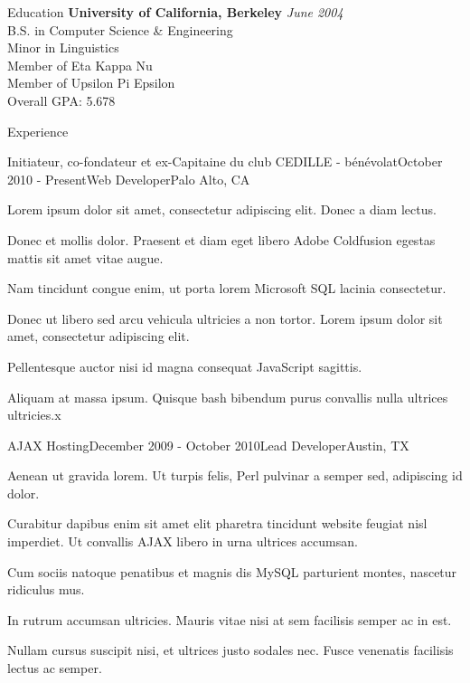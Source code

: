 \documentclass{resume}
\begin{document}
  \begin{rSection}{Education}
    {\bf University of California, Berkeley} \hfill {\em June 2004} \\ 
    { B.S. in Computer Science \& Engineering } \\
    { Minor in Linguistics } \smallskip \\
    { Member of Eta Kappa Nu } \\
    { Member of Upsilon Pi Epsilon } \\
    Overall GPA: 5.678
  \end{rSection}
   
  \begin{rSection}{Experience}
  
    \begin{rSubsection}{Initiateur, co-fondateur et ex-Capitaine du club CEDILLE - bénévolat}{October 2010 - Present}{Web Developer}{Palo Alto, CA}
    \item Lorem ipsum dolor sit amet, consectetur adipiscing elit. Donec a diam lectus.
    \item Donec et mollis dolor. Praesent et diam eget libero Adobe Coldfusion egestas mattis sit amet vitae augue.
    \item Nam tincidunt congue enim, ut porta lorem Microsoft SQL lacinia consectetur.
    \item Donec ut libero sed arcu vehicula ultricies a non tortor. Lorem ipsum dolor sit amet, consectetur adipiscing elit.
    \item Pellentesque auctor nisi id magna consequat JavaScript sagittis.
    \item Aliquam at massa ipsum. Quisque bash bibendum purus convallis nulla ultrices ultricies.x
    \end{rSubsection}
  
    \begin{rSubsection}{AJAX Hosting}{December 2009 - October 2010}{Lead Developer}{Austin, TX}
    \item Aenean ut gravida lorem. Ut turpis felis, Perl pulvinar a semper sed, adipiscing id dolor.
    \item Curabitur dapibus enim sit amet elit pharetra tincidunt website feugiat nisl imperdiet. Ut convallis AJAX libero in urna ultrices accumsan.
    \item Cum sociis natoque penatibus et magnis dis MySQL parturient montes, nascetur ridiculus mus.
    \item In rutrum accumsan ultricies. Mauris vitae nisi at sem facilisis semper ac in est.
    \item Nullam cursus suscipit nisi, et ultrices justo sodales nec. Fusce venenatis facilisis lectus ac semper.
    \end{rSubsection}


\end{rSection}
\end{document}
